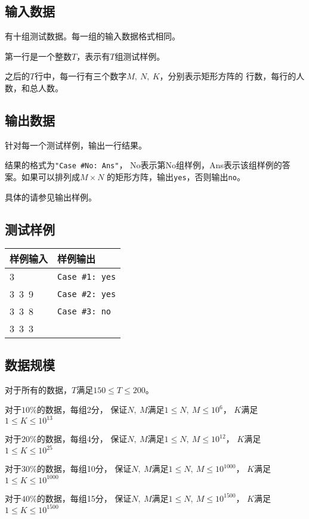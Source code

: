 \documentclass{article}
\begin{document}
\subsection*{输入数据}
有十组测试数据。每一组的输入数据格式相同。

第一行是一个整数$T$，表示有$T$组测试样例。

之后的$T$行中，每一行有三个数字$M,\ N,\ K$，分别表示矩形方阵的
行数，每行的人数，和总人数。

\subsection*{输出数据}
针对每一个测试样例，输出一行结果。

结果的格式为{\tt "Case \#No: Ans"}，
No表示第No组样例，Ans表示该组样例的答案。如果可以排列成$M \times N$
的矩形方阵，输出{\tt yes}，否则输出{\tt no}。

具体的请参见输出样例。

\subsection*{测试样例}
\begin{flushleft}
\begin{tabular}{|p{6cm}|p{6cm}|}
 \hline \bfseries{样例输入} & \bfseries{样例输出} \\
 \hline 
    3 & {\tt Case \#1: yes} \\
    3\ 3\ 9 & {\tt Case \#2: yes} \\
    3\ 3\ 8 & {\tt Case \#3: no} \\
    3\ 3\ 3 & \\
 \hline 
\end{tabular}
\end{flushleft}

\subsection*{数据规模}
对于所有的数据，$T$满足$150 \leq T \leq 200$。

对于$10\%$的数据，每组2分，
保证$N,\ M$满足$1 \leq N,\ M \leq 10^{6}$，
$K$满足$1 \leq K \leq 10^{13}$


对于$20\%$的数据，每组4分，
保证$N,\ M$满足$1 \leq N,\ M \leq 10^{12}$，
$K$满足$1 \leq K \leq 10^{25}$


对于$30\%$的数据，每组10分，
保证$N,\ M$满足$1 \leq N,\ M \leq 10^{1000}$，
$K$满足$1 \leq K \leq 10^{1000}$


对于$40\%$的数据，每组15分，
保证$N,\ M$满足$1 \leq N,\ M \leq 10^{1500}$，
$K$满足$1 \leq K \leq 10^{1500}$

\clearpage



\end{document}
